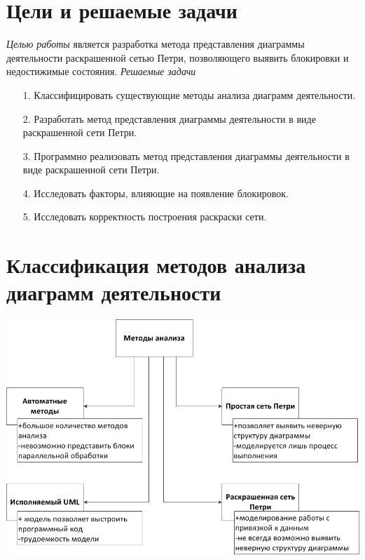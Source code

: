 \documentclass[12pt]{article}
\begin{document}
\TitleSlide

\section{Цели и решаемые задачи}

\emph{Целью работы} является разработка метода представления диаграммы деятельности раскрашенной сетью Петри, позволяющего выявить блокировки и недостижимые состояния.
 
\emph{Решаемые задачи}
\begin{small}
	\begin{enumerate}
	\item[1.] Классифицировать существующие методы анализа диаграмм деятельности.
	\item[2.] Разработать метод представления диаграммы деятельности в виде раскрашенной сети Петри.
	\item[3.] Программно реализовать метод представления диаграммы деятельности в виде раскрашенной сети Петри.
	\item[4.] Исследовать факторы, влияющие на появление блокировок.
	\item[5.] Исследовать корректность построения раскраски сети.
	\end{enumerate}
\end{small}

\section{Классификация методов анализа диаграмм деятельности}

\begin{center}
\includegraphics[scale=1]{../tex/include/MethodClassification.png}
\end{center}
\end{document}
